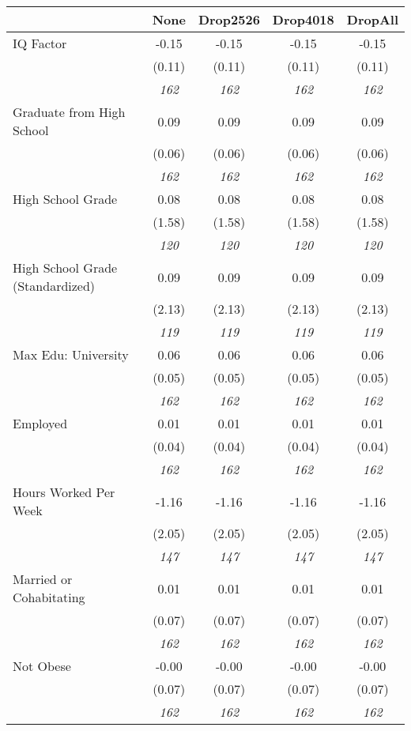 \begin{tabular}{l c c c c}
\toprule
 & None & Drop2526 & Drop4018 & DropAll \\
\midrule
IQ Factor & -0.15 & -0.15 & -0.15 & -0.15 \\
& (0.11) & (0.11) & (0.11) & (0.11) \\
& \textit{ 162 } & \textit{ 162 } & \textit{ 162 } & \textit{ 162 } \\
Graduate from High School & 0.09 & 0.09 & 0.09 & 0.09 \\
& (0.06) & (0.06) & (0.06) & (0.06) \\
& \textit{ 162 } & \textit{ 162 } & \textit{ 162 } & \textit{ 162 } \\
High School Grade & 0.08 & 0.08 & 0.08 & 0.08 \\
& (1.58) & (1.58) & (1.58) & (1.58) \\
& \textit{ 120 } & \textit{ 120 } & \textit{ 120 } & \textit{ 120 } \\
High School Grade (Standardized) & 0.09 & 0.09 & 0.09 & 0.09 \\
& (2.13) & (2.13) & (2.13) & (2.13) \\
& \textit{ 119 } & \textit{ 119 } & \textit{ 119 } & \textit{ 119 } \\
Max Edu: University & 0.06 & 0.06 & 0.06 & 0.06 \\
& (0.05) & (0.05) & (0.05) & (0.05) \\
& \textit{ 162 } & \textit{ 162 } & \textit{ 162 } & \textit{ 162 } \\
Employed & 0.01 & 0.01 & 0.01 & 0.01 \\
& (0.04) & (0.04) & (0.04) & (0.04) \\
& \textit{ 162 } & \textit{ 162 } & \textit{ 162 } & \textit{ 162 } \\
Hours Worked Per Week & -1.16 & -1.16 & -1.16 & -1.16 \\
& (2.05) & (2.05) & (2.05) & (2.05) \\
& \textit{ 147 } & \textit{ 147 } & \textit{ 147 } & \textit{ 147 } \\
Married or Cohabitating & 0.01 & 0.01 & 0.01 & 0.01 \\
& (0.07) & (0.07) & (0.07) & (0.07) \\
& \textit{ 162 } & \textit{ 162 } & \textit{ 162 } & \textit{ 162 } \\
Not Obese & -0.00 & -0.00 & -0.00 & -0.00 \\
& (0.07) & (0.07) & (0.07) & (0.07) \\
& \textit{ 162 } & \textit{ 162 } & \textit{ 162 } & \textit{ 162 } \\

\end{tabular}
